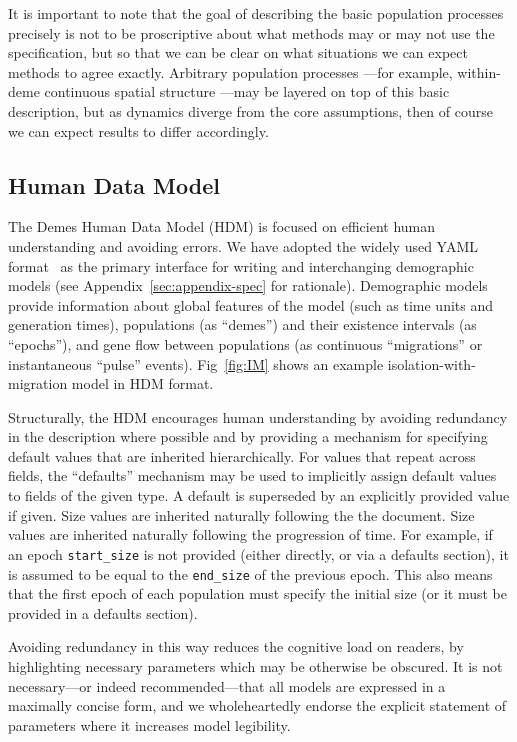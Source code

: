 \documentclass[11pt]{article}
\begin{document}
It is important to note that the goal of describing
the basic population processes precisely is not to be
proscriptive about what methods may or may not use the specification,
but so that we can be clear on what situations we can
expect methods to agree exactly. Arbitrary population
processes
---for example, within-deme
continuous spatial structure
\citep{wright1943isolation,barton2002neutral,barton2010new,
ringbauer2017inferring,battey2020space}---may
be layered on top of this basic description,
but as dynamics diverge from the core assumptions,
then of course we can expect results to differ
accordingly.

\subsection*{Human Data Model}

The Demes Human Data Model (HDM) is focused on efficient human
understanding and avoiding errors.
We have adopted the widely used YAML format~\citep{ben2009yaml} as the
primary interface for writing and interchanging demographic models
(see Appendix~\ref{sec:appendix-spec} for rationale).
Demographic models provide information about global
features of the model (such as time units and generation times),
populations (as ``demes'') and their existence intervals (as ``epochs''),
and gene flow between populations
(as continuous ``migrations'' or instantaneous ``pulse'' events).
Fig~\ref{fig:IM} shows an example isolation-with-migration model in HDM format.

Structurally, the HDM encourages human understanding
by avoiding redundancy in the description where possible and by providing a
mechanism for specifying default values that are inherited hierarchically.
For values that repeat
across fields, the ``defaults'' mechanism may be used to implicitly assign default values to
fields of the given type.  A default is superseded by an explicitly provided
value if given. Size values are inherited naturally following the
the document. Size values are inherited naturally following the
progression of time. For example, if an epoch \texttt{start\_size} is not
provided (either directly, or via a defaults section),
it is assumed to be equal to the \texttt{end\_size} of the previous
epoch. This also means that the first epoch of each population must specify the
initial size (or it must be provided in a defaults section).

Avoiding redundancy in this way reduces the cognitive load on readers,
by highlighting necessary parameters which may be otherwise be obscured.
It is not necessary---or indeed recommended---that all models are expressed
in a maximally concise form, and we wholeheartedly endorse
the explicit statement of parameters where it increases model legibility.
\end{document}
